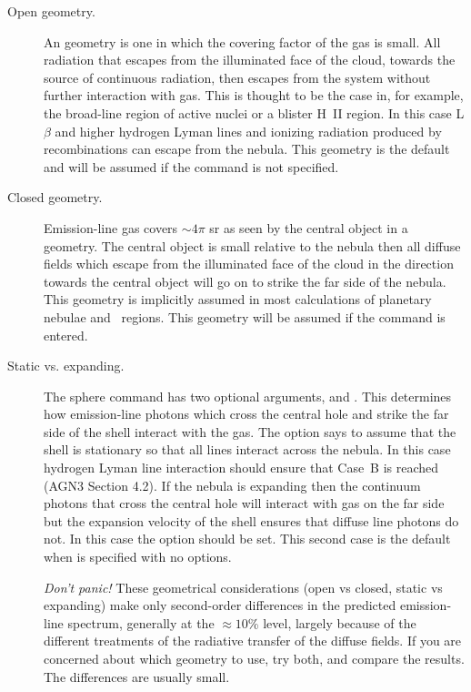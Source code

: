 \begin{description}
\item[Open geometry.]
An  geometry is one in which the covering factor
of the gas is small. All radiation that escapes from the illuminated face
of the cloud, towards the source of continuous radiation, then escapes from
the system without further interaction with gas. This is thought to be
the case in, for example, the broad-line region of active nuclei or a blister
H~II region.  In this case L$\beta$ and higher hydrogen Lyman lines and ionizing
radiation produced by recombinations can escape from the nebula.  This
geometry is the default and will be assumed if the  command is not specified.

\item[Closed geometry.]
Emission-line gas covers ${\sim}4\pi$ sr as seen by the central
object in a  geometry.
The central object is small relative to
the nebula then all diffuse fields which escape from the illuminated face
of the cloud in the direction towards the central object will go on to strike
the far side of the nebula.
This geometry is implicitly assumed in most
calculations of planetary nebulae and \hii\ regions.
This geometry will be
assumed if the  command is entered.

\item[Static vs. expanding.]
The sphere command has two optional arguments,
 and .  This determines how emission-line photons which cross
the central hole and strike the far side of the shell interact with the
gas.  The  option says to assume that the shell is stationary so that
all lines interact across the nebula.  In this case hydrogen Lyman line
interaction should ensure that Case~B is reached (AGN3 Section 4.2).  If
the nebula is expanding then the continuum photons that cross the central
hole will interact with gas on the far side but the expansion velocity of
the shell ensures that diffuse line photons do not.  In this case the
 option should be set.  This second case is the default
when 
is specified with no options.

\emph{Don't panic!}  These geometrical considerations (open vs closed, static
vs expanding) make only second-order differences in the predicted
emission-line spectrum, generally at the ${\approx}10$\% level, largely because of
the different treatments of the radiative transfer of the diffuse fields.
If you are concerned about which geometry to use, try both, and compare
the results.  The differences are usually small.
\end{description}

